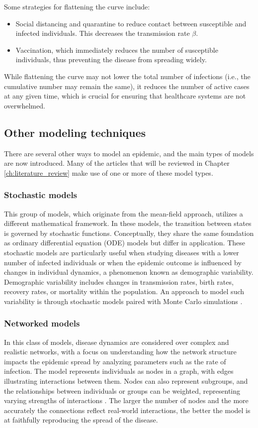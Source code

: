 Some strategies for flattening the curve include:
\begin{itemize}
	\item Social distancing and quarantine to reduce contact between susceptible and infected individuals. This decreases the transmission rate $\beta$.
	\item Vaccination, which immediately reduces the number of susceptible individuals, thus preventing the disease from spreading widely.
\end{itemize}
While flattening the curve may not lower the total number of infections (i.e., the cumulative number may remain the same), it reduces the number of active cases at any given time, which is crucial for ensuring that healthcare systems are not overwhelmed.


\subsection{Other modeling techniques}
There are several other ways to model an epidemic, and the main types of models are now introduced. Many of the articles that will be reviewed in Chapter \ref{ch:literature_review} make use of one or more of these model types.
\subsubsection{Stochastic models} 	
This group of models, which originate from the mean-field approach, utilizes a different mathematical framework. In these models, the transition between states is governed by stochastic functions. Conceptually, they share the same foundation as ordinary differential equation (ODE) models but differ in application. These stochastic models are particularly useful when studying diseases with a lower number of infected individuals or when the epidemic outcome is influenced by changes in individual dynamics, a phenomenon known as demographic variability. Demographic variability includes changes in transmission rates, birth rates, recovery rates, or mortality within the population.
An approach to model such variability is through stochastic models paired with Monte Carlo simulations \cite{Allen2017}.

\subsubsection{Networked models}
In this class of models, disease dynamics are considered over complex and realistic networks, with a focus on understanding how the network structure impacts the epidemic spread by analyzing parameters such as the rate of infection. The model represents individuals as nodes in a graph, with edges illustrating interactions between them. Nodes can also represent subgroups, and the relationships between individuals or groups can be weighted, representing varying strengths of interactions \cite{Newman2002,VanMieghem2009}. The larger the number of nodes and the more accurately the connections reflect real-world interactions, the better the model is at faithfully reproducing the spread of the disease.


